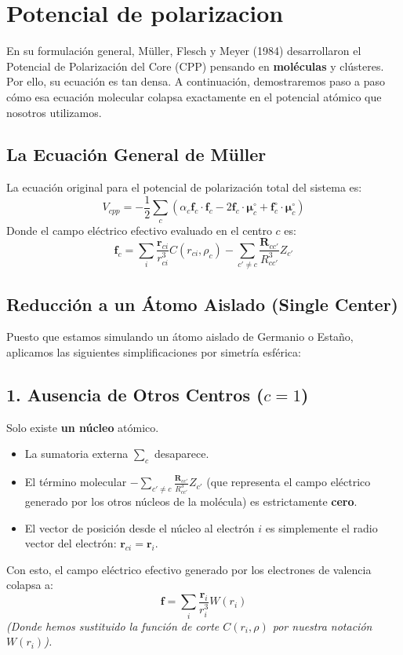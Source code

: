 \documentclass[11pt,a4paper]{article}
\begin{document}
\section{Potencial de polarizacion}

En su formulación general, Müller, Flesch y Meyer (1984) desarrollaron el Potencial de Polarización del Core (CPP) pensando en \textbf{moléculas} y clústeres. Por ello, su ecuación es tan densa. A continuación, demostraremos paso a paso cómo esa ecuación molecular colapsa exactamente en el potencial atómico que nosotros utilizamos.

\subsection{La Ecuación General de Müller}
La ecuación original para el potencial de polarización total del sistema es:
\begin{equation}
V_{cpp} = -\frac{1}{2} \sum_c \left( \alpha_c \mathbf{f}_c \cdot \mathbf{f}_c - 2\mathbf{f}_c \cdot \boldsymbol{\mu}_c^{\circ} + \mathbf{f}_c^{\circ} \cdot \boldsymbol{\mu}_c^{\circ} \right)
\end{equation}
Donde el campo eléctrico efectivo evaluado en el centro $c$ es:
\begin{equation}
\mathbf{f}_c = \sum_i \frac{\mathbf{r}_{ci}}{r_{ci}^3} C(r_{ci}, \rho_c) - \sum_{c' \neq c} \frac{\mathbf{R}_{cc'}}{R_{cc'}^3} Z_{c'}
\end{equation}

\subsection{Reducción a un Átomo Aislado (Single Center)}
Puesto que estamos simulando un átomo aislado de Germanio o Estaño, aplicamos las siguientes simplificaciones por simetría esférica:

\subsection{1. Ausencia de Otros Centros ($c = 1$)}
Solo existe \textbf{un núcleo} atómico.
\begin{itemize}
    \item La sumatoria externa $\sum_c$ desaparece.
    \item El término molecular $-\sum_{c' \neq c} \frac{\mathbf{R}_{cc'}}{R_{cc'}^3} Z_{c'}$ (que representa el campo eléctrico generado por los otros núcleos de la molécula) es estrictamente \textbf{cero}.
    \item El vector de posición desde el núcleo al electrón $i$ es simplemente el radio vector del electrón: $\mathbf{r}_{ci} = \mathbf{r}_i$.
\end{itemize}
Con esto, el campo eléctrico efectivo generado por los electrones de valencia colapsa a:
\begin{equation}
\mathbf{f} = \sum_i \frac{\mathbf{r}_i}{r_i^3} W(r_i)
\end{equation}
\textit{(Donde hemos sustituido la función de corte $C(r_i, \rho)$ por nuestra notación $W(r_i)$).}
\end{document}
